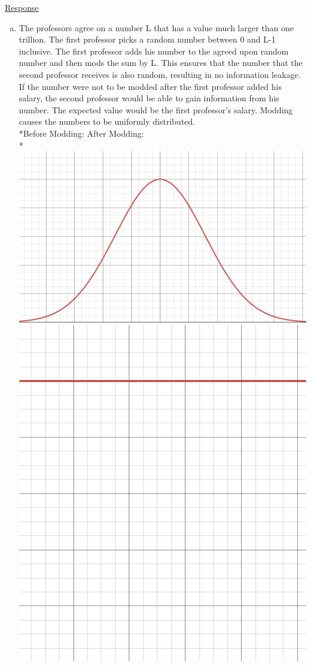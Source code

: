 \documentclass[12pt]{article}
\begin{document}
\noindent
\uline{Response}
\begin{enumerate}[(a)]
\item The professors agree on a number L that has a value much larger than one trillion. The first professor picks a random number between 0 and L-1 inclusive. The first professor adds his number to the agreed upon random number and then mods the sum by L. This ensures that the number that the second professor receives is also random, resulting in no information leakage. If the number were not to be modded after the first professor added his salary, the second professor would be able to gain information from his number. The expected value would be the first professor's salary. Modding causes the numbers to be uniformly distributed. 
\smallskip
\\*Before Modding: \hspace{2.55 in} After Modding: 
\vspace{0.1 in}
\\*\includegraphics [scale = 0.2] {BellCurve} \hspace{1.5 in} \includegraphics [scale = 0.2] {BellCurveMod}

\end{enumerate}
\end{document}
